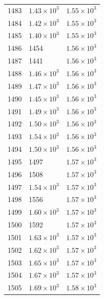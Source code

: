 \begin{table}[H]
\begin{tabular}{lll}
1483 & $\displaystyle 1.43 \times 10^{3}$ & $\displaystyle 1.55 \times 10^{3}$ \\
1484 & $\displaystyle 1.42 \times 10^{3}$ & $\displaystyle 1.55 \times 10^{3}$ \\
1485 & $\displaystyle 1.40 \times 10^{3}$ & $\displaystyle 1.55 \times 10^{3}$ \\
1486 & 1454 & $\displaystyle 1.56 \times 10^{3}$ \\
1487 & 1441 & $\displaystyle 1.56 \times 10^{3}$ \\
1488 & $\displaystyle 1.46 \times 10^{3}$ & $\displaystyle 1.56 \times 10^{3}$ \\
1489 & $\displaystyle 1.47 \times 10^{3}$ & $\displaystyle 1.56 \times 10^{3}$ \\
1490 & $\displaystyle 1.45 \times 10^{3}$ & $\displaystyle 1.56 \times 10^{3}$ \\
1491 & $\displaystyle 1.49 \times 10^{3}$ & $\displaystyle 1.56 \times 10^{3}$ \\
1492 & $\displaystyle 1.50 \times 10^{3}$ & $\displaystyle 1.56 \times 10^{3}$ \\
1493 & $\displaystyle 1.54 \times 10^{3}$ & $\displaystyle 1.56 \times 10^{3}$ \\
1494 & $\displaystyle 1.50 \times 10^{3}$ & $\displaystyle 1.56 \times 10^{3}$ \\
1495 & 1497 & $\displaystyle 1.57 \times 10^{3}$ \\
1496 & 1508 & $\displaystyle 1.57 \times 10^{3}$ \\
1497 & $\displaystyle 1.54 \times 10^{3}$ & $\displaystyle 1.57 \times 10^{3}$ \\
1498 & 1556 & $\displaystyle 1.57 \times 10^{3}$ \\
1499 & $\displaystyle 1.60 \times 10^{3}$ & $\displaystyle 1.57 \times 10^{3}$ \\
1500 & 1592 & $\displaystyle 1.57 \times 10^{3}$ \\
1501 & $\displaystyle 1.63 \times 10^{3}$ & $\displaystyle 1.57 \times 10^{3}$ \\
1502 & $\displaystyle 1.62 \times 10^{3}$ & $\displaystyle 1.57 \times 10^{3}$ \\
1503 & $\displaystyle 1.65 \times 10^{3}$ & $\displaystyle 1.57 \times 10^{3}$ \\
1504 & $\displaystyle 1.67 \times 10^{3}$ & $\displaystyle 1.57 \times 10^{3}$ \\
1505 & $\displaystyle 1.69 \times 10^{3}$ & $\displaystyle 1.58 \times 10^{3}$ \\

\end{tabular}
\end{table}
